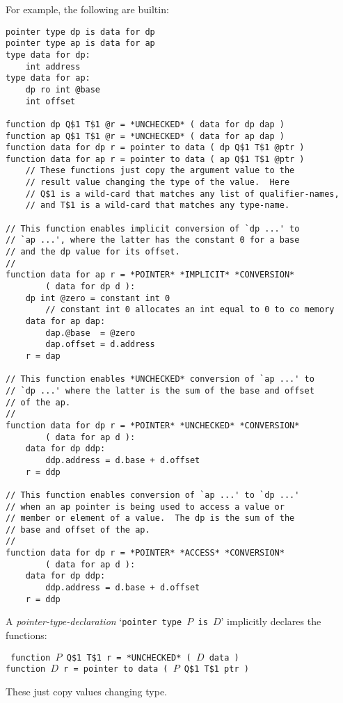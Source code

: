 \documentclass[12pt]{article}
\newenvironment{indpar}[1][0.3in]%
	{\begin{list}{}%
		     {\setlength{\itemsep}{0in}%
		      \setlength{\topsep}{0in}%
		      \setlength{\parsep}{1ex}%
		      \setlength{\labelwidth}{#1}%
		      \setlength{\leftmargin}{#1}%
		      \addtolength{\leftmargin}{\labelsep}}%
	 \item}%
	{\end{list}}
\begin{document}
For example, the following are builtin:

\begin{indpar}\begin{verbatim}
pointer type dp is data for dp
pointer type ap is data for ap
type data for dp:
    int address
type data for ap:
    dp ro int @base
    int offset

function dp Q$1 T$1 @r = *UNCHECKED* ( data for dp dap )
function ap Q$1 T$1 @r = *UNCHECKED* ( data for ap dap )
function data for dp r = pointer to data ( dp Q$1 T$1 @ptr )
function data for ap r = pointer to data ( ap Q$1 T$1 @ptr )
    // These functions just copy the argument value to the
    // result value changing the type of the value.  Here
    // Q$1 is a wild-card that matches any list of qualifier-names,
    // and T$1 is a wild-card that matches any type-name.

// This function enables implicit conversion of `dp ...' to
// `ap ...', where the latter has the constant 0 for a base
// and the dp value for its offset.
// 
function data for ap r = *POINTER* *IMPLICIT* *CONVERSION*
        ( data for dp d ):
    dp int @zero = constant int 0
        // constant int 0 allocates an int equal to 0 to co memory
    data for ap dap:
        dap.@base  = @zero
        dap.offset = d.address
    r = dap

// This function enables *UNCHECKED* conversion of `ap ...' to
// `dp ...' where the latter is the sum of the base and offset
// of the ap.
//
function data for dp r = *POINTER* *UNCHECKED* *CONVERSION*
        ( data for ap d ):
    data for dp ddp:
        ddp.address = d.base + d.offset
    r = ddp

// This function enables conversion of `ap ...' to `dp ...'
// when an ap pointer is being used to access a value or
// member or element of a value.  The dp is the sum of the
// base and offset of the ap.
//
function data for dp r = *POINTER* *ACCESS* *CONVERSION*
        ( data for ap d ):
    data for dp ddp:
        ddp.address = d.base + d.offset
    r = ddp
\end{verbatim}\end{indpar}

A {\em pointer-type-declaration} `{\tt pointer type $P$ is $D$}'
implicitly declares the functions:
\begin{indpar} \tt
function $P$ Q\$1 T\$1 r = *UNCHECKED* ( $D$ data ) \\
function $D$ r = pointer to data ( $P$ Q\$1 T\$1 ptr )
\end{indpar}
These just copy values changing type.
\end{document}
